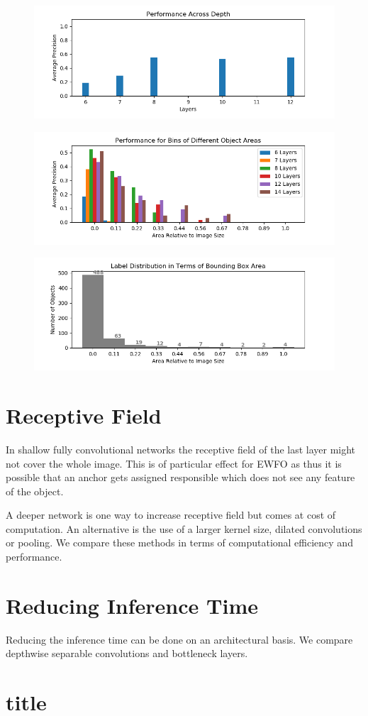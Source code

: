 	\begin{figure}
		\includegraphics[width=\textwidth]{fig/perf_depth}
	\end{figure}


	\begin{figure}
		\includegraphics[width=\textwidth]{fig/depth_ap_size}
	\end{figure}
		\begin{figure}
		\includegraphics[width=\textwidth]{fig/distr_size}
	\end{figure}
	\section{Receptive Field}
	
	In shallow fully convolutional networks the receptive field of the last layer might not cover the whole image. This is of particular effect for \ac{EWFO} as thus it is possible that an anchor gets assigned responsible which does not see any feature of the object.
	
	A deeper network is one way to increase receptive field but comes at cost of computation. An alternative is the use of a larger kernel size, dilated convolutions or pooling. We compare these methods in terms of computational efficiency and performance.
		
	\section{Reducing Inference Time}
	
	Reducing the inference time can be done on an architectural basis. We compare depthwise separable convolutions and bottleneck layers.
	
	\section{title}